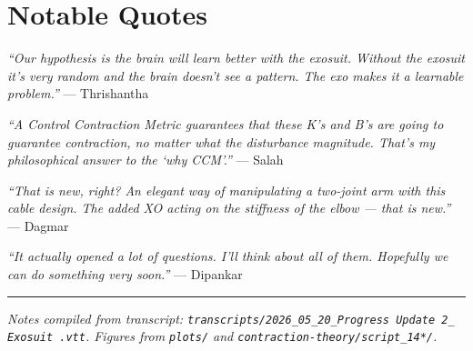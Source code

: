 \documentclass[11pt, a4paper]{article}
\begin{document}
\section*{Notable Quotes}

\begin{mdframed}[backgroundcolor=gray!8, linecolor=gray!50]
\textit{``Our hypothesis is the brain will learn better with the exosuit. Without the exosuit
it's very random and the brain doesn't see a pattern. The exo makes it a learnable problem.''}
\hfill --- Thrishantha
\end{mdframed}

\vspace{4pt}
\begin{mdframed}[backgroundcolor=gray!8, linecolor=gray!50]
\textit{``A Control Contraction Metric guarantees that these K's and B's are going to
guarantee contraction, no matter what the disturbance magnitude. That's my philosophical
answer to the `why CCM'.''} \hfill --- Salah
\end{mdframed}

\vspace{4pt}
\begin{mdframed}[backgroundcolor=gray!8, linecolor=gray!50]
\textit{``That is new, right? An elegant way of manipulating a two-joint arm with this cable
design. The added XO acting on the stiffness of the elbow --- that is new.''}
\hfill --- Dagmar
\end{mdframed}

\vspace{4pt}
\begin{mdframed}[backgroundcolor=gray!8, linecolor=gray!50]
\textit{``It actually opened a lot of questions. I'll think about all of them.
Hopefully we can do something very soon.''}
\hfill --- Dipankar
\end{mdframed}

\vspace{1cm}
\hrule
\vspace{4pt}
{\small\textit{Notes compiled from transcript:
\texttt{transcripts/2026\_05\_20\_Progress Update 2\_ Exosuit .vtt}.
Figures from \texttt{plots/} and \texttt{contraction-theory/script\_14*/}.}}
\end{document}
